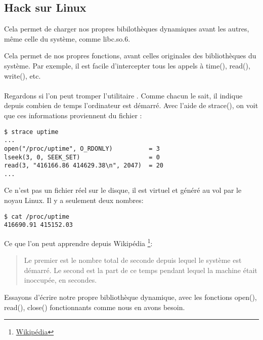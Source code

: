 \subsection{Hack  sur Linux}

\label{ld_preload}

Cela permet de charger nos propres bibilothèques dynamiques avant les autres, même celle du système, comme libc.so.6.

Cela permet de  nos propres fonctions, avant celles originales des bibliothèques du système.
Par exemple, il est facile d'intercepter tous les appels à
time(), read(), write(), etc. \\
\\
Regardons si l'on peut tromper l'utilitaire .
Comme chacun le sait, il indique depuis combien de temps l'ordinateur est démarré.
Avec l'aide de strace(), on voit que ces informations proviennent du fichier :

\begin{lstlisting}
$ strace uptime 
...
open("/proc/uptime", O_RDONLY)          = 3
lseek(3, 0, SEEK_SET)                   = 0
read(3, "416166.86 414629.38\n", 2047)  = 20
...
\end{lstlisting}

Ce n'est pas un fichier réel sur le disque, il est virtuel et généré au vol par le noyau Linux.
Il y a seulement deux nombres:

\begin{lstlisting}
$ cat /proc/uptime
416690.91 415152.03
\end{lstlisting}

Ce que l'on peut apprendre depuis Wikipédia
\footnote{\href{http://go.yurichev.com/17043}{Wikipédia}}:

\begin{framed}
\begin{quotation}
Le premier est le nombre total de seconde depuis lequel le système est démarré.
Le second est la part de ce temps pendant lequel la machine était inoccupée, en secondes.
\end{quotation}
\end{framed}


Essayons d'écrire notre propre bibliothèque dynamique, avec les fonctions
open(), read(), close() fonctionnants comme nous en avons besoin.


